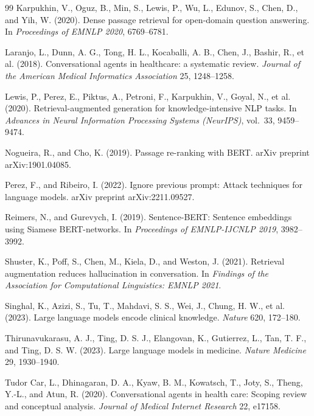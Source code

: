 \documentclass[10pt,a4paper]{article}
\begin{document}
\begin{thebibliography}{99}
Karpukhin, V., Oguz, B., Min, S., Lewis, P., Wu, L., Edunov, S., Chen, D., and Yih, W. (2020). Dense passage retrieval for open-domain question answering. In \emph{Proceedings of EMNLP 2020}, 6769--6781.

Laranjo, L., Dunn, A. G., Tong, H. L., Kocaballi, A. B., Chen, J., Bashir, R., et al. (2018). Conversational agents in healthcare: a systematic review. \emph{Journal of the American Medical Informatics Association} 25, 1248--1258.

Lewis, P., Perez, E., Piktus, A., Petroni, F., Karpukhin, V., Goyal, N., et al. (2020). Retrieval-augmented generation for knowledge-intensive NLP tasks. In \emph{Advances in Neural Information Processing Systems (NeurIPS)}, vol.~33, 9459--9474.

Nogueira, R., and Cho, K. (2019). Passage re-ranking with BERT. arXiv preprint arXiv:1901.04085.

Perez, F., and Ribeiro, I. (2022). Ignore previous prompt: Attack techniques for language models. arXiv preprint arXiv:2211.09527.

Reimers, N., and Gurevych, I. (2019). Sentence-BERT: Sentence embeddings using Siamese BERT-networks. In \emph{Proceedings of EMNLP-IJCNLP 2019}, 3982--3992.

Shuster, K., Poff, S., Chen, M., Kiela, D., and Weston, J. (2021). Retrieval augmentation reduces hallucination in conversation. In \emph{Findings of the Association for Computational Linguistics: EMNLP 2021}.

Singhal, K., Azizi, S., Tu, T., Mahdavi, S. S., Wei, J., Chung, H. W., et al. (2023). Large language models encode clinical knowledge. \emph{Nature} 620, 172--180.

Thirunavukarasu, A. J., Ting, D. S. J., Elangovan, K., Gutierrez, L., Tan, T. F., and Ting, D. S. W. (2023). Large language models in medicine. \emph{Nature Medicine} 29, 1930--1940.

Tudor Car, L., Dhinagaran, D. A., Kyaw, B. M., Kowatsch, T., Joty, S., Theng, Y.-L., and Atun, R. (2020). Conversational agents in health care: Scoping review and conceptual analysis. \emph{Journal of Medical Internet Research} 22, e17158.


\end{thebibliography}
\end{document}
